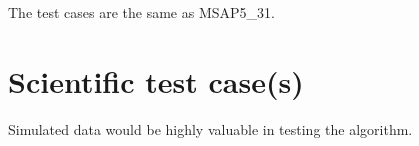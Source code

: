 \documentclass[a4paper, oneside, 11pt, article, english]{memoir}
\begin{document}
The test cases are the same as MSAP5\_31. 

\section{Scientific test case(s)}
\label{sec:test-science}

Simulated data would be highly valuable in testing the algorithm. 



\end{document}
